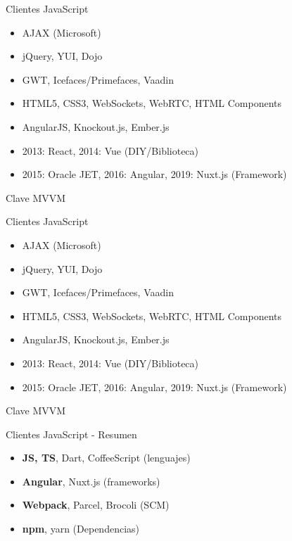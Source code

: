 \documentclass[aspectratio=169]{beamer}
\begin{document}
\begin{frame}{Clientes JavaScript}
	\begin{itemize}
		\item AJAX (Microsoft)
		\item jQuery, YUI, Dojo
		\pause \item GWT, Icefaces/Primefaces, Vaadin
		\pause \item HTML5, CSS3, WebSockets, WebRTC, HTML Components
		\pause \item AngularJS, Knockout.js, Ember.js
		\pause \item 2013: React, 2014: Vue (DIY/Biblioteca)
		\pause \item 2015: Oracle JET, 2016: Angular, 2019: Nuxt.js (Framework)
	\end{itemize}
	Clave MVVM
\end{frame}


\begin{frame}{Clientes JavaScript}
\begin{itemize}
	\item AJAX (Microsoft)
	\item jQuery, YUI, Dojo
	\pause \item GWT, Icefaces/Primefaces, Vaadin
	\pause \item HTML5, CSS3, WebSockets, WebRTC, HTML Components
	\pause \item AngularJS, Knockout.js, Ember.js
	\pause \item 2013: React, 2014: Vue (DIY/Biblioteca)
	\pause \item 2015: Oracle JET, 2016: Angular, 2019: Nuxt.js (Framework)
\end{itemize}
Clave MVVM
\end{frame}


\begin{frame}{Clientes JavaScript - Resumen}
\begin{itemize}
	\item \textbf{JS, TS}, Dart, CoffeeScript (lenguajes)
	\item \textbf{Angular}, Nuxt.js (frameworks)
	\item \textbf{Webpack}, Parcel, Brocoli (SCM)
	\item \textbf{npm}, yarn (Dependencias)
\end{itemize}
\end{frame}
\end{document}
